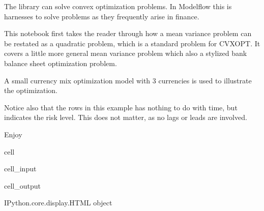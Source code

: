\documentclass[letterpaper,10pt,english]{jupyterBook}
\begin{document}
\sphinxAtStartPar
The  library can solve convex optimization problems. In Modelflow this is harnesses to solve  problems as they frequently arise in finance.

\sphinxAtStartPar
This notebook first takes the reader through how a mean variance problem can be restated as a quadratic problem, which is a standard problem for CVXOPT. It covers a little more general mean variance problem which also a stylized bank balance sheet optimization problem.

\sphinxAtStartPar
{}

\sphinxAtStartPar
A small currency mix optimization model with 3 currencies is used to illustrate the optimization.

\sphinxAtStartPar
Notice also that the rows in this example has nothing to do with time, but indicates the risk level. This does not matter, as no lags or leads are involved.

\sphinxAtStartPar
Enjoy

\begin{sphinxuseclass}{cell}\begin{sphinxVerbatimInput}

\begin{sphinxuseclass}{cell_input}
\begin{sphinxVerbatim}[commandchars=\\\{\}]
   
    

    

\end{sphinxVerbatim}

\end{sphinxuseclass}\end{sphinxVerbatimInput}
\begin{sphinxVerbatimOutput}

\begin{sphinxuseclass}{cell_output}
\begin{sphinxVerbatim}[commandchars=\\\{\}]
\PYGZlt{}IPython.core.display.HTML object\PYGZgt{}
\end{sphinxVerbatim}

\end{sphinxuseclass}\end{sphinxVerbatimOutput}

\end{sphinxuseclass}
\end{document}
